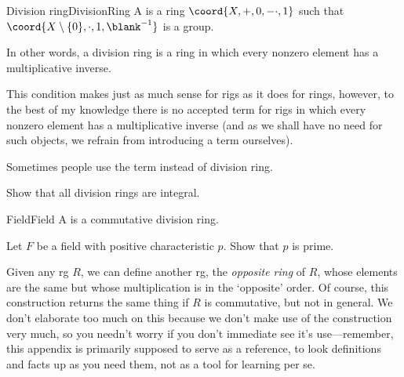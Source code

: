 \begin{dfn}{Division ring}{DivisionRing}
A  is a ring $\coord{X,+,0,-\cdot ,1}$ such that $\coord{X\setminus \{ 0\} ,\cdot ,1,\blank ^{-1}}$ is a group.
\begin{rmk}
In other words, a division ring is a ring in which every nonzero element has a multiplicative inverse.
\end{rmk}
\begin{rmk}
This condition makes just as much sense for rigs as it does for rings, however, to the best of my knowledge there is no accepted term for rigs in which every nonzero element has a multiplicative inverse (and as we shall have no need for such objects, we refrain from introducing a term ourselves).
\end{rmk}
\begin{rmk}
Sometimes people use the term  instead of division ring.
\end{rmk}
\end{dfn}
\begin{exr}{}{}
Show that all division rings are integral.
\end{exr}
\begin{dfn}{Field}{Field}
A  is a commutative division ring.
\end{dfn}
\begin{exr}{}{}
Let $F$ be a field with positive characteristic $p$.  Show that $p$ is prime.
\end{exr}
Given any rg $R$, we can define another rg, the \emph{opposite ring} of $R$, whose elements are the same but whose multiplication is in the `opposite' order.  Of course, this construction returns the same thing if $R$ is commutative, but not in general.  We don't elaborate too much on this because we don't make use of the construction very much, so you needn't worry if you don't immediate see it's use---remember, this appendix is primarily supposed to serve as a reference, to look definitions and facts up as you need them, not as a tool for learning per se.
